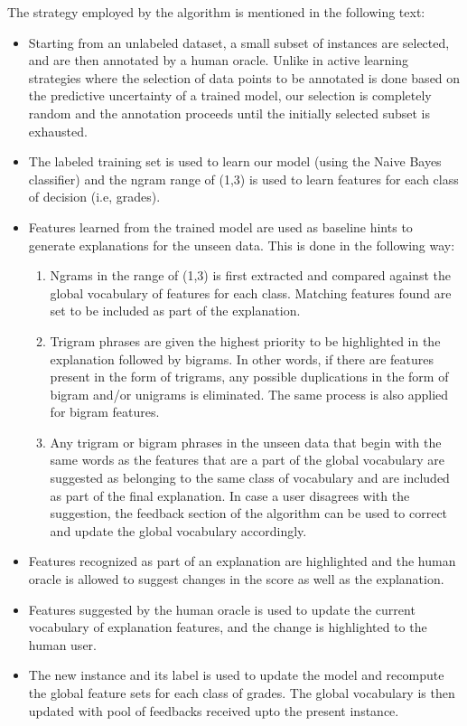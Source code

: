\documentclass[letterpaper, 10 pt, conference]{ieeeconf}  %
\begin{document}
The strategy employed by the algorithm is mentioned in the following text:
\begin{itemize}
\item Starting from an unlabeled dataset, a small subset of instances are selected, and are then annotated by a human oracle. Unlike in active learning strategies where the selection of data points to be annotated is done based on the predictive uncertainty of a trained model, our selection is completely random and the annotation proceeds until the initially selected subset is exhausted.
\item The labeled training set is used to learn our model (using the Naive Bayes classifier) and the ngram range of (1,3) is used to learn features for each class of decision (i.e, grades).
\item Features learned from the trained model are used as baseline hints to generate explanations for the unseen data. This is done in the following way:
\begin{enumerate}
\item Ngrams in the range of (1,3) is first extracted and compared against the global vocabulary of features for each class. Matching features found are set to be included as part of the explanation.
\item Trigram phrases are given the highest priority to be highlighted in the explanation followed by bigrams. In other words, if there are features present in the form of trigrams, any possible duplications in the form of bigram and/or unigrams is eliminated. The same process is also applied for bigram features.
\item Any trigram or bigram phrases in the unseen data that begin with the same words as the features that are a part of the global vocabulary are suggested as belonging to the same class of vocabulary and are included as part of the final explanation. In case a user disagrees with the suggestion, the feedback section of the algorithm can be used to correct and update the global vocabulary accordingly.
\end{enumerate}
\item Features recognized as part of an explanation are highlighted and the human oracle is allowed to suggest changes in  the score as well as the explanation.
\item Features suggested by the human oracle is used to update the current vocabulary of explanation features, and the change is highlighted to the human user.
\item The new instance and its label is used to update the model and recompute the global feature sets for each class of grades. The global vocabulary is then updated with pool of feedbacks received upto the present instance.
\end{itemize}
\end{document}

